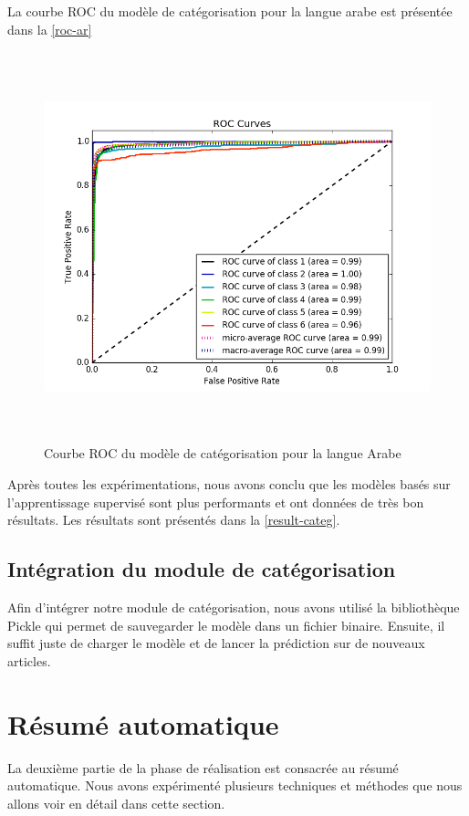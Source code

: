     La courbe ROC du modèle de catégorisation pour la langue arabe est présentée dans la \autoref{roc-ar} 
    \begin{figure}[H]
        \centering
        \includegraphics[height=320pt,width=330pt]{img/chapter4/result/rocAR.png}
        \caption{Courbe ROC du modèle de catégorisation pour la langue Arabe}
        \label{roc-ar}
    \end{figure}

    Après toutes les expérimentations, nous avons conclu que les modèles basés sur l'apprentissage supervisé sont plus performants et ont données de très bon résultats. Les résultats sont présentés dans la \autoref{result-categ}.
    
\subsection{Intégration du module de catégorisation}
Afin d'intégrer notre module de catégorisation, nous avons utilisé la bibliothèque Pickle qui permet de sauvegarder le modèle dans un fichier binaire. Ensuite, il suffit juste de charger le modèle et de lancer la prédiction sur de nouveaux articles.


\section{Résumé automatique}
La deuxième partie de la phase de réalisation est consacrée au résumé automatique. Nous avons expérimenté plusieurs techniques et méthodes que nous allons voir en détail dans cette section. 
